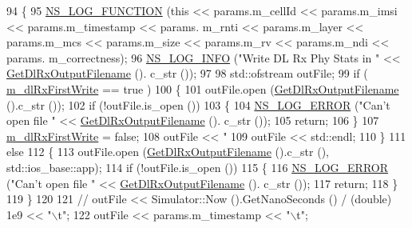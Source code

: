 \begin{DoxyCode}
94 \{
95   \hyperlink{log-macros-disabled_8h_a90b90d5bad1f39cb1b64923ea94c0761}{NS\_LOG\_FUNCTION} (\textcolor{keyword}{this} << params.m\_cellId << params.m\_imsi << params.m\_timestamp << params.
      m\_rnti << params.m\_layer << params.m\_mcs << params.m\_size << params.m\_rv << params.m\_ndi << params.
      m\_correctness);
96   \hyperlink{group__logging_gafbd73ee2cf9f26b319f49086d8e860fb}{NS\_LOG\_INFO} (\textcolor{stringliteral}{"Write DL Rx Phy Stats in "} << \hyperlink{classns3_1_1PhyRxStatsCalculator_a9b30d6bef15b40b7402eb559de719e2b}{GetDlRxOutputFilename} ().
      c\_str ());
97 
98   std::ofstream outFile;
99   \textcolor{keywordflow}{if} ( \hyperlink{classns3_1_1PhyRxStatsCalculator_a213f01bace4b066672eb60b4e394acf7}{m\_dlRxFirstWrite} == \textcolor{keyword}{true} )
100     \{
101       outFile.open (\hyperlink{classns3_1_1PhyRxStatsCalculator_a9b30d6bef15b40b7402eb559de719e2b}{GetDlRxOutputFilename} ().c\_str ());
102       \textcolor{keywordflow}{if} (!outFile.is\_open ())
103         \{
104           \hyperlink{group__logging_ga0261a8db1d4ac5f79417d117634fd455}{NS\_LOG\_ERROR} (\textcolor{stringliteral}{"Can't open file "} << \hyperlink{classns3_1_1PhyRxStatsCalculator_a9b30d6bef15b40b7402eb559de719e2b}{GetDlRxOutputFilename} ().
      c\_str ());
105           \textcolor{keywordflow}{return};
106         \}
107       \hyperlink{classns3_1_1PhyRxStatsCalculator_a213f01bace4b066672eb60b4e394acf7}{m\_dlRxFirstWrite} = \textcolor{keyword}{false};
108       outFile << \textcolor{stringliteral}{"%
109       outFile << std::endl;
110     \}
111   \textcolor{keywordflow}{else}
112     \{
113       outFile.open (\hyperlink{classns3_1_1PhyRxStatsCalculator_a9b30d6bef15b40b7402eb559de719e2b}{GetDlRxOutputFilename} ().c\_str (),  std::ios\_base::app);
114       \textcolor{keywordflow}{if} (!outFile.is\_open ())
115         \{
116           \hyperlink{group__logging_ga0261a8db1d4ac5f79417d117634fd455}{NS\_LOG\_ERROR} (\textcolor{stringliteral}{"Can't open file "} << \hyperlink{classns3_1_1PhyRxStatsCalculator_a9b30d6bef15b40b7402eb559de719e2b}{GetDlRxOutputFilename} ().
      c\_str ());
117           \textcolor{keywordflow}{return};
118         \}
119     \}
120 
121 \textcolor{comment}{//   outFile << Simulator::Now ().GetNanoSeconds () / (double) 1e9 << "\(\backslash\)t";}
122   outFile << params.m\_timestamp << \textcolor{stringliteral}{"\(\backslash\)t"};
}
\end{DoxyCode}
